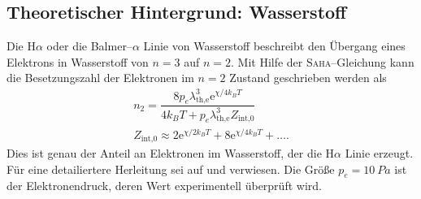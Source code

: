 \subsection{Theoretischer Hintergrund: Wasserstoff}
Die H$\alpha $ oder die Balmer--$\alpha $ Linie von Wasserstoff beschreibt den Übergang eines Elektrons in Wasserstoff von $n=3$ auf $n=2$.
Mit Hilfe der \textsc{Saha}--Gleichung kann die Besetzungszahl der Elektronen im $n=2$ Zustand geschrieben werden als
\begin{align} 
  n_2=\dfrac{8p_e\lambda _{\text{th,e}}^3\text{e}^{\chi /4k_BT}}{4k_BT+p_e\lambda _{\text{th,e}}^3Z_{\text{int,0}}}\\
  Z_{\text{int,0}}\approx 2\text{e}^{\chi /2k_BT}+8\text{e}^{\chi /4k_BT}+\hdots 
.\end{align} 
Dies ist genau der Anteil an Elektronen im Wasserstoff, der die H$\alpha $ Linie erzeugt.
Für eine detailiertere Herleitung sei auf \cite{anleitung464} und \cite{saha} verwiesen.
Die Größe $p_e=\SI{10}{Pa}$ ist der Elektronendruck, deren Wert experimentell überprüft wird.
